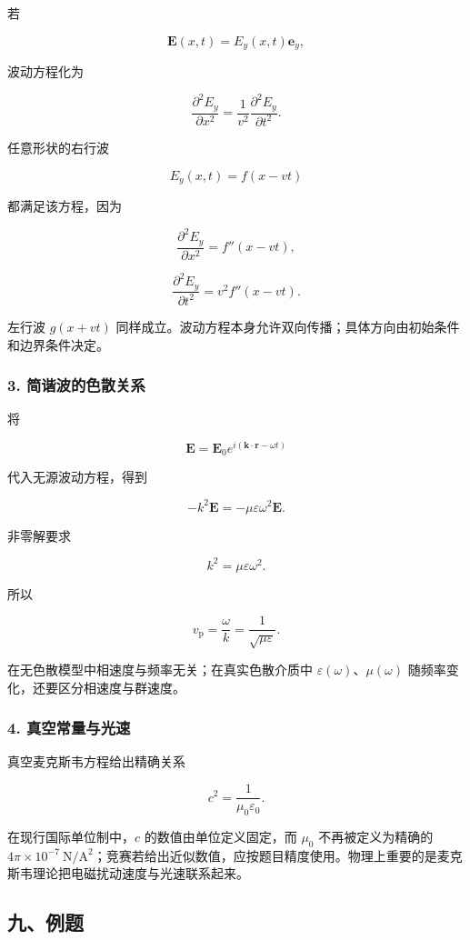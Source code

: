 若

\[
\mathbf E(x,t)=E_y(x,t)\mathbf e_y,
\]

波动方程化为

\[
\frac{\partial^2E_y}{\partial x^2}
=\frac1{v^2}
\frac{\partial^2E_y}{\partial t^2}.
\]

任意形状的右行波

\[
E_y(x,t)=f(x-vt)
\]

都满足该方程，因为

\[
\frac{\partial^2E_y}{\partial x^2}=f''(x-vt),
\]

\[
\frac{\partial^2E_y}{\partial t^2}=v^2f''(x-vt).
\]

左行波 \(g(x+vt)\)
同样成立。波动方程本身允许双向传播；具体方向由初始条件和边界条件决定。

\subsubsection{3.
简谐波的色散关系}\label{m7:ux7b80ux8c10ux6ce2ux7684ux8272ux6563ux5173ux7cfb}

将

\[
\mathbf E=\mathbf E_0e^{i(\mathbf k\cdot\mathbf r-\omega t)}
\]

代入无源波动方程，得到

\[
-k^2\mathbf E
=-\mu\varepsilon\omega^2\mathbf E.
\]

非零解要求

\[
k^2=\mu\varepsilon\omega^2.
\]

所以

\[
v_{\mathrm p}=\frac\omega k
=\frac1{\sqrt{\mu\varepsilon}}.
\]

在无色散模型中相速度与频率无关；在真实色散介质中
\(\varepsilon(\omega)\)、\(\mu(\omega)\)
随频率变化，还要区分相速度与群速度。

\subsubsection{4.
真空常量与光速}\label{m7:ux771fux7a7aux5e38ux91cfux4e0eux5149ux901f}

真空麦克斯韦方程给出精确关系

\[
c^2=\frac1{\mu_0\varepsilon_0}.
\]

在现行国际单位制中，\(c\) 的数值由单位定义固定，而 \(\mu_0\)
不再被定义为精确的
\(4\pi\times10^{-7}\ \mathrm{N/A^2}\)；竞赛若给出近似数值，应按题目精度使用。物理上重要的是麦克斯韦理论把电磁扰动速度与光速联系起来。

\subsection{九、例题}\label{m7:ux4e5dux4f8bux9898}

